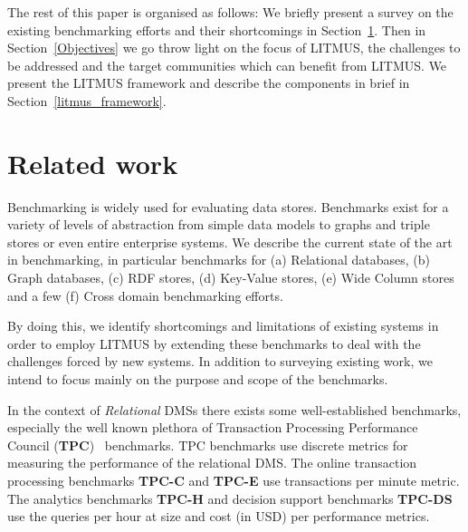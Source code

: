 \documentclass{llncs}
\begin{document}
    The rest of this paper is organised as follows: We briefly present a survey on the existing benchmarking efforts and their shortcomings in Section~\ref{relwork}. Then in Section~\ref{Objectives} we go throw light on the focus of LITMUS, the challenges to be addressed and the target communities which can benefit from LITMUS. We present the LITMUS framework and describe the components in brief in Section~\ref{litmus_framework}.  




\section{Related work}\label{relwork}

    Benchmarking is widely used for evaluating data stores. Benchmarks exist for a variety of levels of abstraction from simple data models to graphs and triple stores or even entire enterprise systems.
    We describe the current state of the art in benchmarking, in particular benchmarks for (a) Relational databases, (b) Graph databases, (c) RDF stores, (d) Key-Value stores, (e) Wide Column stores and a few (f) Cross domain benchmarking efforts.
    
    By doing this, we identify shortcomings and limitations of existing systems in order to employ LITMUS by extending these benchmarks to deal with the challenges forced by new systems.
    In addition to surveying existing work, we intend to focus mainly on the purpose and scope of the benchmarks.
    
    In the context of \textit{Relational} DMSs there exists some well-established benchmarks, especially the well known plethora of Transaction Processing Performance Council (\textbf{TPC})~\cite{Nambiar2011} benchmarks.
    TPC benchmarks use discrete metrics for measuring the performance of the relational DMS. The online transaction processing benchmarks \textbf{TPC-C} and \textbf{TPC-E} use transactions per minute metric. The analytics benchmarks \textbf{TPC-H} and decision support benchmarks \textbf{TPC-DS} use the queries per hour at size and cost (in USD) per performance metrics.
    
\end{document}
